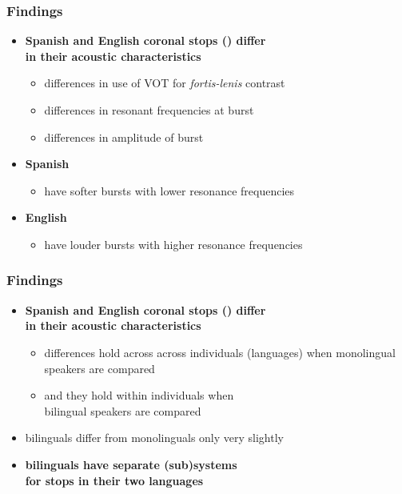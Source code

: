 \documentclass{beamer}
\begin{document}
\begin{frame}
\frametitle{Findings}
\begin{itemize}
	\item \textbf{Spanish and English coronal stops () differ \\ in their acoustic characteristics}
	\begin{itemize}
		\item differences in use of VOT for \emph{fortis-lenis} contrast
		\item differences in resonant frequencies at burst
		\item differences in amplitude of burst
	\end{itemize}
	\item \textbf{Spanish }
	\begin{itemize}
		\item have softer bursts with lower resonance frequencies
	\end{itemize}
	\item \textbf{English }
	\begin{itemize}
		\item have louder bursts with higher resonance frequencies
	\end{itemize}
\end{itemize}
\end{frame}

\begin{frame}
\frametitle{Findings}
\begin{itemize}
	\item \textbf{Spanish and English coronal stops () differ \\ in their acoustic characteristics}
	\begin{itemize}
		\item differences hold across across individuals (languages) when monolingual speakers are compared
		\item and they hold within individuals when \\ bilingual speakers are compared
	\end{itemize}
	\item bilinguals differ from monolinguals only very slightly
	\item \textbf{bilinguals have separate (sub)systems \\ for stops in their two languages}
\end{itemize}
\end{frame}
\end{document}
